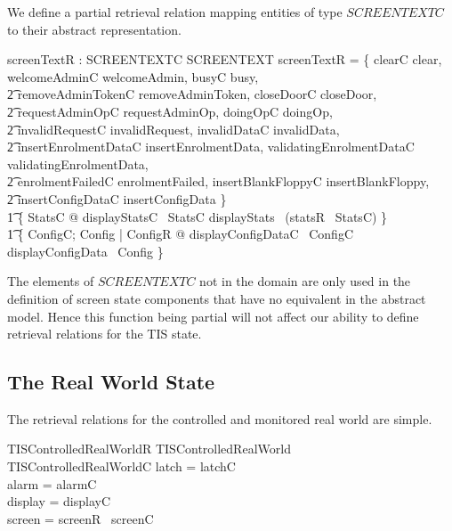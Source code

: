 We define a partial retrieval relation mapping entities of type $SCREENTEXTC$
to their abstract representation.

\begin{axdef}
        screenTextR : SCREENTEXTC \rel SCREENTEXT
\where
        screenTextR = \{ clearC \mapsto clear, 
        welcomeAdminC \mapsto welcomeAdmin, 
        busyC \mapsto busy,
\\ \t2  removeAdminTokenC \mapsto removeAdminToken,
        closeDoorC \mapsto closeDoor,
\\ \t2        requestAdminOpC \mapsto requestAdminOp,
        doingOpC \mapsto doingOp,
\\ \t2        invalidRequestC \mapsto invalidRequest,
        invalidDataC \mapsto invalidData,
\\ \t2        insertEnrolmentDataC \mapsto insertEnrolmentData,
        validatingEnrolmentDataC \mapsto validatingEnrolmentData,
\\ \t2        enrolmentFailedC \mapsto enrolmentFailed,
        insertBlankFloppyC \mapsto insertBlankFloppy,
\\ \t2        insertConfigDataC \mapsto insertConfigData
         \}
\\ \t1  \cup \{ StatsC @ displayStatsC~ \theta StatsC \mapsto displayStats~
        (statsR~ \theta StatsC) \}
\\ \t1  \cup \{ ConfigC; Config | ConfigR @ displayConfigDataC~ \theta ConfigC \mapsto displayConfigData~ \theta Config \}    
\end{axdef}
\begin{Zcomment}
\item
The elements of $SCREENTEXTC$ not in the domain are only used in the
definition of screen state components that have no equivalent in the abstract
model. Hence this function being partial will not affect our ability
to define retrieval relations for the TIS state.
\end{Zcomment}

\subsection{The Real World State}

The retrieval relations for the controlled and monitored real world
are simple.

\begin{schema}{TISControlledRealWorldR}
        TISControlledRealWorld
\\      TISControlledRealWorldC
\where
        latch = latchC
\\      alarm = alarmC
\\      display = displayC
\\      screen = screenR~ screenC
\end{schema}


